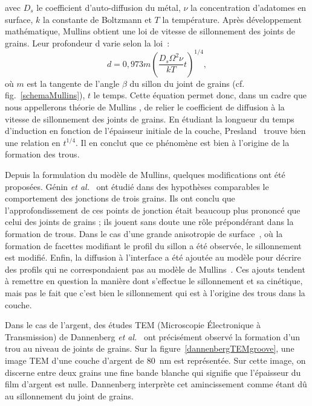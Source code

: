avec $D_s$ le coefficient d'auto-diffusion du métal, $\nu$ la concentration d'adatomes en surface, $k$ la constante de Boltzmann et $T$ la température. Après développement mathématique, Mullins obtient une loi de vitesse de sillonnement des joints de grains. Leur profondeur d varie selon la loi~:
\begin{equation}
d = 0,973m\left(\dfrac{D_s\Omega^2\nu}{kT}t\right)^{1/4},
\end{equation}
où $m$ est la tangente de l'angle $\beta$ du sillon du joint de grains (cf. fig.~\ref{schemaMullins}), $t$ le temps. Cette équation permet donc, dans un cadre que nous appellerons \og théorie de Mullins \fg{}, de relier le coefficient de diffusion à la vitesse de sillonnement des joints de grains. En étudiant la longueur du temps d'induction en fonction de l'épaisseur initiale de la couche, Presland~\cite{presland1972hillock} trouve bien une relation en $t^{1/4}$. Il en conclut que ce phénomène est bien à l'origine de la formation des trous.\par 
Depuis la formulation du modèle de Mullins, quelques modifications ont été proposées. Génin \textit{et al.}~\cite{genin1992capillary} ont étudié dans des hypothèses comparables le comportement des jonctions de trois grains. Ils ont conclu que l'approfondissement de ces points de jonction était beaucoup plus prononcé que celui des joints de grains ; ils jouent sans doute une rôle prépondérant dans la formation de trous. Dans le cas d'une grande anisotropie de surface~\cite{klinger2011kinetics}, où la formation de facettes modifiant le profil du sillon a été observée, le sillonnement est modifié. Enfin, la diffusion à l'interface a été ajoutée au modèle pour décrire des profils qui ne correspondaient pas au modèle de Mullins~\cite{amram2014grain}. Ces ajouts tendent à remettre en question la manière dont s'effectue le sillonnement et sa cinétique, mais pas le fait que c'est bien le sillonnement qui est à l'origine des trous dans la couche.\par 
Dans le cas de l'argent, des études TEM (Microscopie Électronique à Transmission) de Dannenberg \textit{et al.}~\cite{dannenberg2000situ} ont précisément observé la formation d'un trou au niveau de joints de grains. Sur la figure~\ref{dannenbergTEMgroove}, une image TEM d'une couche d'argent de 80~nm est représentée. Sur cette image, on discerne entre deux grains une fine bande blanche qui signifie que l'épaisseur du film d'argent est nulle. Dannenberg interprète cet amincissement comme étant dû au sillonnement du joint de grains.\par
